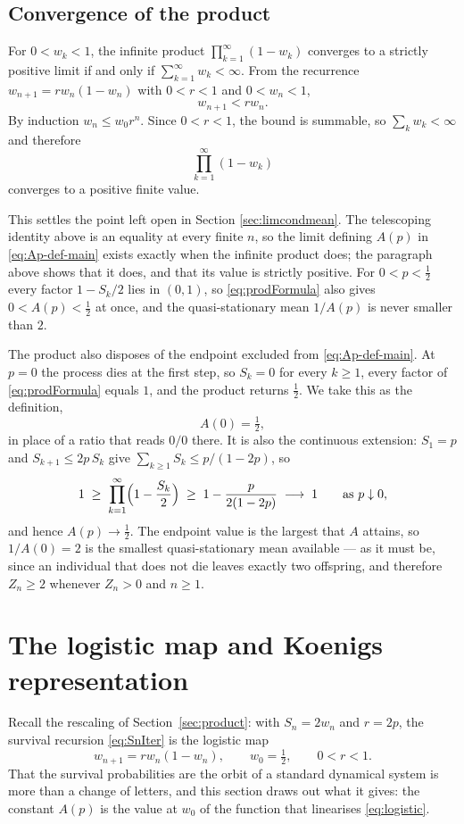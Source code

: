 \documentclass[11pt]{article}
\begin{document}
\subsection{Convergence of the product}
For $0<w_k<1$, the infinite product $\prod_{k=1}^{\infty}(1-w_k)$ converges to a strictly positive limit if and only if $\sum_{k=1}^{\infty}w_k<\infty$.
From the recurrence $w_{n+1}=r w_n(1-w_n)$ with $0<r<1$ and $0<w_n<1$,
\[
w_{n+1}<r w_n.
\]
By induction $w_n\le w_0 r^n$. Since $0<r<1$, the bound is summable, so $\sum_k w_k<\infty$ and therefore
\[
\prod_{k=1}^{\infty}(1-w_k)
\]
converges to a positive finite value.

This settles the point left open in Section \ref{sec:limcondmean}. The telescoping identity above is an equality at every finite $n$, so the limit defining $A(p)$ in \eqref{eq:Ap-def-main} exists exactly when the infinite product does; the paragraph above shows that it does, and that its value is strictly positive. For $0<p<\tfrac12$ every factor $1-S_k/2$ lies in $(0,1)$, so \eqref{eq:prodFormula} also gives $0<A(p)<\tfrac12$ at once, and the quasi-stationary mean $1/A(p)$ is never smaller than $2$.

The product also disposes of the endpoint excluded from \eqref{eq:Ap-def-main}. At $p=0$ the process dies at the first step, so $S_k=0$ for every $k\ge1$, every factor of \eqref{eq:prodFormula} equals $1$, and the product returns $\tfrac12$. We take this as the definition,
\[
A(0)=\tfrac12,
\]
in place of a ratio that reads $0/0$ there. It is also the continuous extension: $S_1=p$ and $S_{k+1}\le 2p\,S_k$ give $\sum_{k\ge1}S_k\le p/(1-2p)$, so
\[
1\;\ge\;\prod_{k=1}^{\infty}\Bigl(1-\frac{S_k}{2}\Bigr)\;\ge\;1-\frac{p}{2(1-2p)}\;\longrightarrow\;1
\qquad\text{as }p\downarrow0,
\]
and hence $A(p)\to\tfrac12$. The endpoint value is the largest that $A$ attains, so $1/A(0)=2$ is the smallest quasi-stationary mean available --- as it must be, since an individual that does not die leaves exactly two offspring, and therefore $Z_n\ge2$ whenever $Z_n>0$ and $n\ge1$.


\section{The logistic map and Koenigs representation}
\label{sec:koenigs}

Recall the rescaling of Section~\ref{sec:product}: with $S_n=2w_n$ and $r=2p$, the
survival recursion \eqref{eq:SnIter} is the logistic map
\begin{equation}
w_{n+1} = r w_n (1 - w_n),
\qquad w_0=\tfrac12,
\qquad 0<r<1 .
\label{eq:logistic}
\end{equation}
That the survival probabilities are the orbit of a standard dynamical system is
more than a change of letters, and this section draws out what it gives: the
constant $A(p)$ is the value at $w_0$ of the function that linearises \eqref{eq:logistic}.
\end{document}
